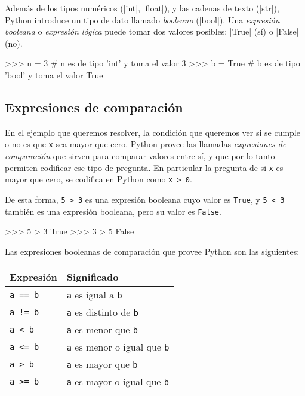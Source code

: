 Además de los tipos numéricos (|int|, |float|), y las cadenas de texto (|str|),
Python introduce un tipo de dato llamado \emph{booleano} (|bool|). Una
\emph{expresión booleana} o \emph{expresión lógica} puede tomar dos valores posibles:
|True| (sí) o |False| (no).

\begin{codigo-python-sn}
>>> n = 3    # n es de tipo 'int' y toma el valor 3
>>> b = True # b es de tipo 'bool' y toma el valor True
\end{codigo-python-sn}

\subsection{Expresiones de comparación}

En el ejemplo que queremos resolver, la condición que queremos ver si se
cumple o no es que \lstinline!x! sea mayor que cero. Python provee las
llamadas \emph{expresiones de comparación} que sirven para comparar valores
entre sí, y que por lo tanto permiten codificar ese tipo de pregunta.  En
particular la pregunta de si \lstinline!x! es mayor que cero, se codifica
en Python como \lstinline!x > 0!.

De esta forma, \lstinline+5 > 3+ es una expresión booleana cuyo valor es
\lstinline!True!, y \lstinline+5 < 3+ también es una expresión booleana, pero su
valor es \lstinline!False!.

\begin{codigo-python-sn}
>>> 5 > 3
True
>>> 3 > 5
False
\end{codigo-python-sn}

Las expresiones
booleanas de comparación que provee Python son las siguientes:

\newcommand{\tablaComparacion}{
\begin{center}
\begin{tabular}[c]{l l}
{\bf Expresión} & {\bf Significado}\\
\hline
\lstinline!a == b!& \lstinline!a! es igual a \lstinline!b! \\
\lstinline+a != b+& \lstinline!a! es distinto de \lstinline!b! \\
\lstinline!a < b!& \lstinline!a! es menor que \lstinline!b! \\
\lstinline!a <= b!& \lstinline!a! es menor o igual que \lstinline!b! \\
\lstinline!a > b!& \lstinline!a! es mayor que \lstinline!b! \\
\lstinline!a >= b!& \lstinline!a! es mayor o igual que \lstinline!b! \\
\end{tabular}
\end{center}
}
\tablaComparacion

